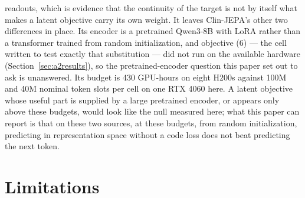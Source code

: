 \documentclass[11pt,a4paper]{article}
\begin{document}
\begin{itemize}[leftmargin=*,itemsep=3pt,topsep=3pt]
      readouts, which is evidence that the continuity of the target is not by
      itself what makes a latent objective carry its own weight. It leaves
      Clin-JEPA's other two differences in place. Its encoder is a pretrained
      Qwen3-8B with LoRA rather than a transformer trained from random
      initialization, and objective (6) --- the cell written to test exactly
      that substitution --- did not run on the available hardware
      (Section~\ref{sec:a2results}), so the pretrained-encoder question this
      paper set out to ask is unanswered. Its budget is 430 GPU-hours on eight
      H200s against 100M and 40M nominal token slots per cell on one RTX 4060
      here. A latent objective whose useful part is supplied by a large
      pretrained encoder, or appears only above these budgets, would look like
      the null measured here; what this paper can report is that on these two
      sources, at these budgets, from random initialization, predicting in
      representation space without a code loss does not beat predicting the
      next token.
\end{itemize}

\section{Limitations}
\label{sec:limitations}
\end{document}
